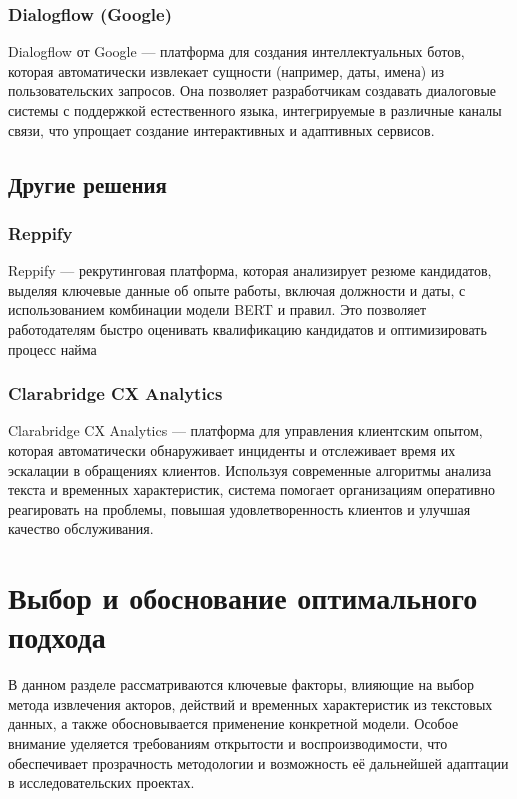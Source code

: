 \subsubsection{Dialogflow (Google)}
Dialogflow от Google — платформа для создания интеллектуальных ботов, которая автоматически извлекает сущности (например, даты, имена) из пользовательских запросов. Она позволяет разработчикам создавать диалоговые системы с поддержкой естественного языка, интегрируемые в различные каналы связи, что упрощает создание интерактивных и адаптивных сервисов.

\subsection{Другие решения}

\subsubsection{Reppify}
Reppify — рекрутинговая платформа, которая анализирует резюме кандидатов, выделяя ключевые данные об опыте работы, включая должности и даты, с использованием комбинации модели BERT и правил. Это позволяет работодателям быстро оценивать квалификацию кандидатов и оптимизировать процесс найма

\subsubsection{Clarabridge CX Analytics}
Clarabridge CX Analytics — платформа для управления клиентским опытом, которая автоматически обнаруживает инциденты и отслеживает время их эскалации в обращениях клиентов. Используя современные алгоритмы анализа текста и временных характеристик, система помогает организациям оперативно реагировать на проблемы, повышая удовлетворенность клиентов и улучшая качество обслуживания.

\section{Выбор и обоснование оптимального подхода}

В данном разделе рассматриваются ключевые факторы, влияющие на выбор метода извлечения акторов, действий и временных характеристик из текстовых данных, а также обосновывается применение конкретной модели. Особое внимание уделяется требованиям открытости и воспроизводимости, что обеспечивает прозрачность методологии и возможность её дальнейшей адаптации в исследовательских проектах.


